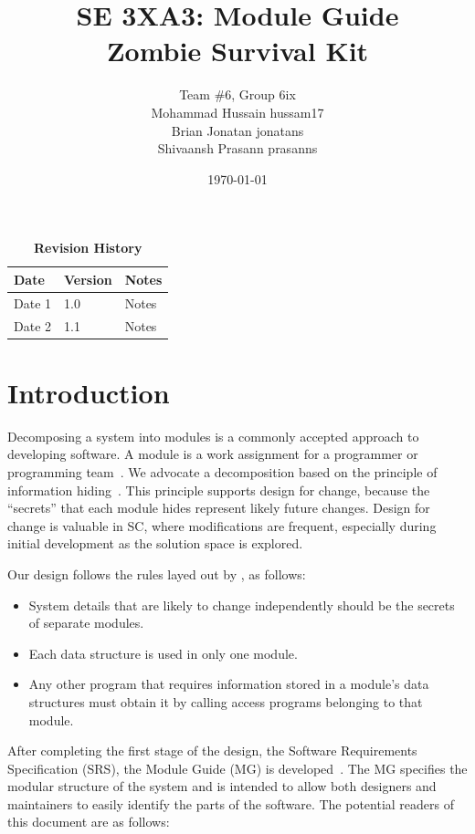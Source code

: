 \documentclass[12pt, titlepage]{article}
\title{SE 3XA3: Module Guide\\Zombie Survival Kit}
\author{Team \#6, Group 6ix
		\\ Mohammad Hussain hussam17
		\\ Brian Jonatan jonatans
		\\ Shivaansh Prasann prasanns
}
\date{\today}
\begin{document}
\maketitle

\tableofcontents
\listoftables
\listoffigures

\begin{table}[bp]
\caption{\bf Revision History}
\begin{tabularx}{\textwidth}{p{3cm}p{2cm}X}
\toprule {\bf Date} & {\bf Version} & {\bf Notes}\\
\midrule
Date 1 & 1.0 & Notes\\
Date 2 & 1.1 & Notes\\
\bottomrule
\end{tabularx}
\end{table}

\newpage


\section{Introduction}

Decomposing a system into modules is a commonly accepted approach to developing
software.  A module is a work assignment for a programmer or programming
team~\citep{ParnasEtAl1984}.  We advocate a decomposition
based on the principle of information hiding~\citep{Parnas1972a}.  This
principle supports design for change, because the ``secrets'' that each module
hides represent likely future changes.  Design for change is valuable in SC,
where modifications are frequent, especially during initial development as the
solution space is explored.  

Our design follows the rules layed out by \citet{ParnasEtAl1984}, as follows:
\begin{itemize}
\item System details that are likely to change independently should be the
  secrets of separate modules.
\item Each data structure is used in only one module.
\item Any other program that requires information stored in a module's data
  structures must obtain it by calling access programs belonging to that module.
\end{itemize}

After completing the first stage of the design, the Software Requirements
Specification (SRS), the Module Guide (MG) is developed~\citep{ParnasEtAl1984}. The MG
specifies the modular structure of the system and is intended to allow both
designers and maintainers to easily identify the parts of the software.  The
potential readers of this document are as follows:
\end{document}
